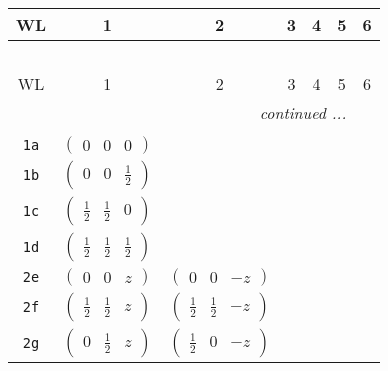 \documentclass[fleqn,9pt,landscape]{jsarticle}
\begin{document}
\begin{center}
\renewcommand{\arraystretch}{1.2}
\begin{longtable}{ccccccc}
 \hline \hline
WL & 1 & 2 & 3 & 4 & 5 & 6 \\ \hline \endfirsthead

\multicolumn{6}{l}{\tablename\ \thetable{}} \\
 \hline \hline
WL & 1 & 2 & 3 & 4 & 5 & 6 \\ \hline \endhead

 \hline \hline
\multicolumn{6}{r}{\footnotesize\it continued ...} \\ \endfoot

 \hline \hline
\multicolumn{6}{r}{} \\ \endlastfoot

{\tt 1a} & $ \begin{pmatrix} 0 & 0 & 0 \end{pmatrix} $ & $  $ & $  $ & $  $ \\ \hline
{\tt 1b} & $ \begin{pmatrix} 0 & 0 & \frac{1}{2} \end{pmatrix} $ & $  $ & $  $ & $  $ \\ \hline
{\tt 1c} & $ \begin{pmatrix} \frac{1}{2} & \frac{1}{2} & 0 \end{pmatrix} $ & $  $ & $  $ & $  $ \\ \hline
{\tt 1d} & $ \begin{pmatrix} \frac{1}{2} & \frac{1}{2} & \frac{1}{2} \end{pmatrix} $ & $  $ & $  $ & $  $ \\ \hline
{\tt 2e} & $ \begin{pmatrix} 0 & 0 & z \end{pmatrix} $ & $ \begin{pmatrix} 0 & 0 & - z \end{pmatrix} $ & $  $ & $  $ \\ \hline
{\tt 2f} & $ \begin{pmatrix} \frac{1}{2} & \frac{1}{2} & z \end{pmatrix} $ & $ \begin{pmatrix} \frac{1}{2} & \frac{1}{2} & - z \end{pmatrix} $ & $  $ & $  $ \\ \hline
{\tt 2g} & $ \begin{pmatrix} 0 & \frac{1}{2} & z \end{pmatrix} $ & $ \begin{pmatrix} \frac{1}{2} & 0 & - z \end{pmatrix} $ & $  $ & $  $ \\ \hline

\end{longtable}
\end{center}
\end{document}
